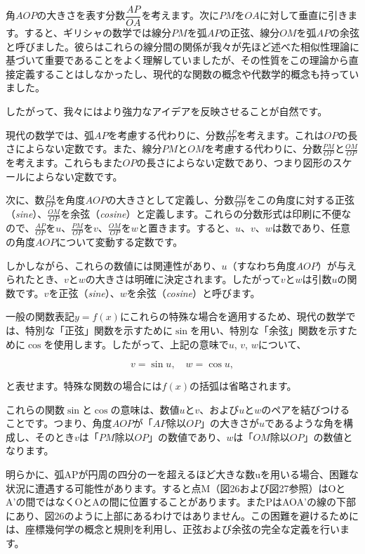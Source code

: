 \documentclass[a4paper,11pt,openany]{ltjsbook}
\begin{document}
角$AOP$の大きさを表す分数$\dfrac{AP}{OA}$を考えます。次に$PM$を$OA$に対して垂直に引きます。すると、ギリシャの数学では線分$PM$を弧$AP$の正弦、線分$OM$を弧$AP$の余弦と呼びました。彼らはこれらの線分間の関係が我々が先ほど述べた相似性理論に基づいて重要であることをよく理解していましたが、その性質をこの理論から直接定義することはしなかったし、現代的な関数の概念や代数学的概念も持っていました。

したがって、我々にはより強力なアイデアを反映させることが自然です。

現代の数学では、弧$AP$を考慮する代わりに、分数$\frac{AP}{OP}$を考えます。これは$OP$の長さによらない定数です。また、線分$PM$と$OM$を考慮する代わりに、分数$\frac{PM}{OP}$と$\frac{OM}{OP}$を考えます。これらもまた$OP$の長さによらない定数であり、つまり図形のスケールによらない定数です。

次に、数$\frac{PA}{OP}$を角度$AOP$の大きさとして定義し、分数$\frac{PM}{OP}$をこの角度に対する正弦（\emph{sine}）、$\frac{OM}{OP}$を余弦（\emph{cosine}）と定義します。これらの分数形式は印刷に不便なので、$\frac{AP}{OP}$を$u$、$\frac{PM}{OP}$を$v$、$\frac{OM}{OP}$を$w$と置きます。すると、$u$、$v$、$w$は数であり、任意の角度$AOP$について変動する定数です。

しかしながら、これらの数値には関連性があり、$u$（すなわち角度$AOP$）が与えられたとき、$v$と$w$の大きさは明確に決定されます。したがって$v$と$w$は引数$u$の関数です。$v$を正弦（\emph{sine}）、$w$を余弦（\emph{cosine}）と呼びます。

一般の関数表記$y = f(x)$にこれらの特殊な場合を適用するため、現代の数学では、特別な「正弦」関数を示すために$\sin$を用い、特別な「余弦」関数を示すために$\cos$を使用します。したがって、上記の意味で$u$, $v$, $w$について、

\[
v = \sin u,\quad w = \cos u,
\]

と表せます。特殊な関数の場合には$f(x)$の括弧は省略されます。

これらの関数$\sin$と$\cos$の意味は、数値$u$と$v$、および$u$と$w$のペアを結びつけることです。つまり、角度$AOP$が「$AP$除以$OP$」の大きさが$u$であるような角を構成し、そのとき$v$は「$PM$除以$OP$」の数値であり、$w$は「$OM$除以$OP$」の数値となります。

明らかに、弧APが円周の四分の一を超えるほど大きな数uを用いる場合、困難な状況に遭遇する可能性があります。すると点M（図26および図27参照）はOとA'の間ではなくOとAの間に位置することがあります。またPはAOA'の線の下部にあり、図26のように上部にあるわけではありません。この困難を避けるためには、座標幾何学の概念と規則を利用し、正弦および余弦の完全な定義を行います。
\end{document}
